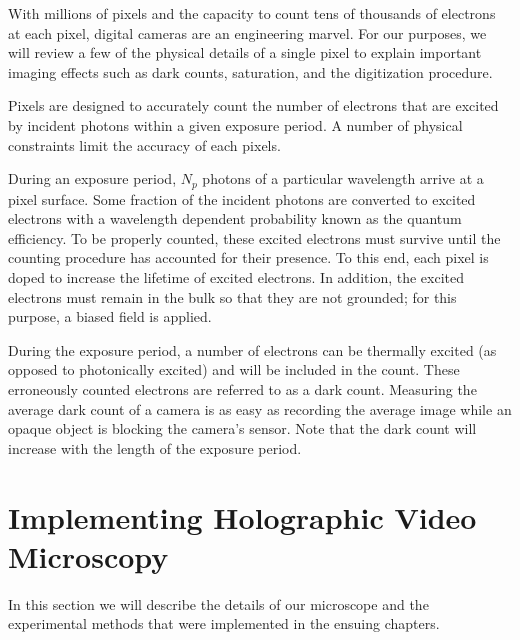 With millions of pixels and the capacity to count tens of thousands of electrons at each pixel,
digital cameras are an engineering marvel. For our purposes, we will review a few of the physical
details of a single pixel to explain important imaging effects such as dark counts, saturation,
and the digitization procedure.

Pixels are designed to accurately count the number of electrons that are
excited by incident photons within a given exposure period. A number of physical constraints
limit the accuracy of each pixels.

During an exposure period, $N_p$ photons of a particular wavelength arrive at a pixel
surface. Some fraction of the incident photons are converted to excited electrons
with a wavelength dependent probability known as the quantum efficiency. To be properly
counted, these excited electrons must survive until the counting procedure has
accounted for their presence. To this end, each pixel is doped to increase the lifetime
of excited electrons. In addition, the excited electrons must remain in the bulk so that
they are not grounded; for this purpose, a biased field is applied. %

During the exposure period, a number of electrons can be thermally excited (as opposed to
photonically excited) and will be included in the count. These erroneously
counted electrons are referred to as a dark count. Measuring the average dark count of a
camera is as easy as recording the average image while an opaque object is blocking the
camera's sensor. Note that the dark count will increase with the length of the exposure
period.




\section{Implementing Holographic Video Microscopy}

In this section we will describe the details of our microscope and
the experimental methods that were implemented in the ensuing chapters.



